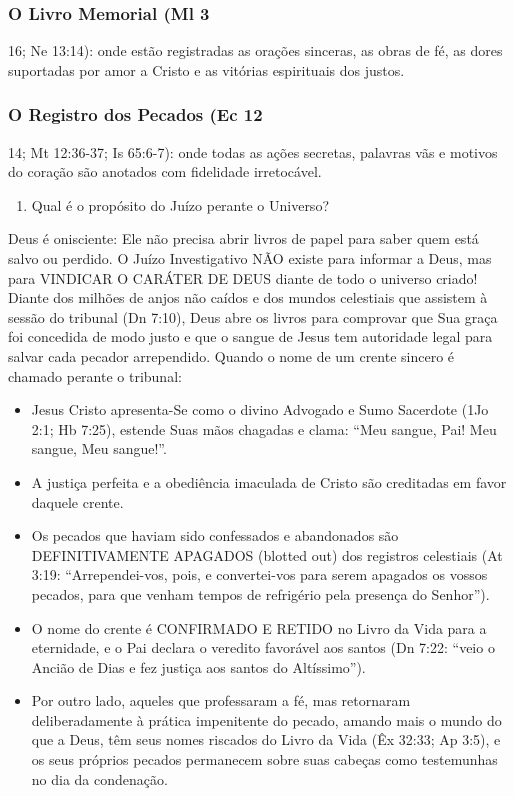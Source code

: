 \subsubsection*{O Livro Memorial (Ml 3}
16; Ne 13:14): onde estão registradas as orações sinceras, as obras de fé, as dores suportadas por amor a Cristo e as vitórias espirituais dos justos.

\subsubsection*{O Registro dos Pecados (Ec 12}
14; Mt 12:36-37; Is 65:6-7): onde todas as ações secretas, palavras vãs e motivos do coração são anotados com fidelidade irretocável.

\begin{enumerate}
  \item Qual é o propósito do Juízo perante o Universo?
\end{enumerate}

Deus é onisciente: Ele não precisa abrir livros de papel para saber quem está salvo ou perdido. O Juízo Investigativo NÃO existe para informar a Deus, mas para VINDICAR O CARÁTER DE DEUS diante de todo o universo criado!
Diante dos milhões de anjos não caídos e dos mundos celestiais que assistem à sessão do tribunal (Dn 7:10), Deus abre os livros para comprovar que Sua graça foi concedida de modo justo e que o sangue de Jesus tem autoridade legal para salvar cada pecador arrependido. Quando o nome de um crente sincero é chamado perante o tribunal:
\begin{itemize}
  \item Jesus Cristo apresenta-Se como o divino Advogado e Sumo Sacerdote (1Jo 2:1; Hb 7:25), estende Suas mãos chagadas e clama: ``Meu sangue, Pai! Meu sangue, Meu sangue!''.
  \item A justiça perfeita e a obediência imaculada de Cristo são creditadas em favor daquele crente.
  \item Os pecados que haviam sido confessados e abandonados são DEFINITIVAMENTE APAGADOS (blotted out) dos registros celestiais (At 3:19: ``Arrependei-vos, pois, e convertei-vos para serem apagados os vossos pecados, para que venham tempos de refrigério pela presença do Senhor'').
  \item O nome do crente é CONFIRMADO E RETIDO no Livro da Vida para a eternidade, e o Pai declara o veredito favorável aos santos (Dn 7:22: ``veio o Ancião de Dias e fez justiça aos santos do Altíssimo'').
  \item Por outro lado, aqueles que professaram a fé, mas retornaram deliberadamente à prática impenitente do pecado, amando mais o mundo do que a Deus, têm seus nomes riscados do Livro da Vida (Êx 32:33; Ap 3:5), e os seus próprios pecados permanecem sobre suas cabeças como testemunhas no dia da condenação.
\end{itemize}



